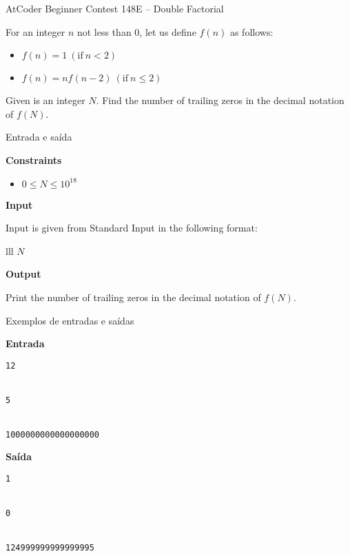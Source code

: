 \begin{frame}[fragile]{AtCoder Beginner Contest 148E -- Double Factorial}

For an integer $n$ not less than 0, let us define $f(n)$ as follows:
\begin{itemize}
    \item $f(n)=1\ (\mbox{if}\ n<2)$
    \item $f(n)=nf(n-2)\ (\mbox{if}\ n\leq 2)$
\end{itemize}

Given is an integer $N$. Find the number of trailing zeros in the decimal notation of $f(N)$.

\end{frame}

\begin{frame}[fragile]{Entrada e saída}

\textbf{Constraints}

\begin{itemize}
    \item $0 \leq N\leq 10^{18}$
\end{itemize}

\vspace{0.1in}

\textbf{Input}

Input is given from Standard Input in the following format:
\begin{atcoderio}{lll}
$N$ \\
\end{atcoderio}

\textbf{Output}


Print the number of trailing zeros in the decimal notation of $f(N)$.

\end{frame}

\begin{frame}[fragile]{Exemplos de entradas e saídas}

\begin{minipage}[t]{0.45\textwidth}
\textbf{Entrada}
\begin{verbatim}
12


5


1000000000000000000
\end{verbatim}
\end{minipage}
\begin{minipage}[t]{0.5\textwidth}
\textbf{Saída}
\begin{verbatim}
1


0


124999999999999995
\end{verbatim}
\end{minipage}
\end{frame}


